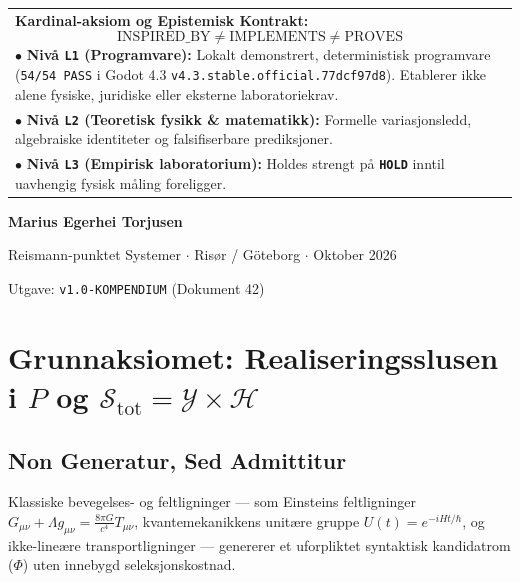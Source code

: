 \documentclass[11pt,a4paper,oneside]{book}
\theoremstyle{definition}
\begin{document}
\begin{titlepage}
\vfill

\begin{tabular}{p{}}
\toprule
\textbf{\textcolor{alertred}{Kardinal-aksiom og Epistemisk Kontrakt:}}
$$\text{INSPIRED\_BY} \neq \text{IMPLEMENTS} \neq \text{PROVES}$$
\footnotesize
$\bullet$ \textbf{Nivå \texttt{L1} (Programvare):} Lokalt demonstrert, deterministisk programvare (\texttt{54/54 PASS} i Godot 4.3 \texttt{v4.3.stable.official.77dcf97d8}). Etablerer ikke alene fysiske, juridiske eller eksterne laboratoriekrav.\\
$\bullet$ \textbf{Nivå \texttt{L2} (Teoretisk fysikk \& matematikk):} Formelle variasjonsledd, algebraiske identiteter og falsifiserbare prediksjoner.\\
$\bullet$ \textbf{Nivå \texttt{L3} (Empirisk laboratorium):} Holdes strengt på \textbf{\texttt{HOLD}} inntil uavhengig fysisk måling foreligger.\\
\bottomrule
\end{tabular}

\vspace{0.8cm}
{\large\textbf{Marius Egerhei Torjusen}\par}
{\normalsize Reismann-punktet Systemer $\cdot$ Risør / Göteborg $\cdot$ Oktober 2026\par}
{\footnotesize Utgave: \texttt{v1.0-KOMPENDIUM} (Dokument 42)\par}
\end{titlepage}

\frontmatter
\tableofcontents

\mainmatter

\chapter{Grunnaksiomet: Realiseringsslusen i $P$ og $\mathcal{S}_{\text{tot}} = \mathcal{Y} \times \mathcal{H}$}

\section{Non Generatur, Sed Admittitur}
Klassiske bevegelses- og feltligninger — som Einsteins feltligninger $G_{\mu\nu} + \Lambda g_{\mu\nu} = \frac{8\pi G}{c^4}T_{\mu\nu}$, kvantemekanikkens unitære gruppe $U(t) = e^{-iHt/\hbar}$, og ikke-lineære transportligninger — genererer et uforpliktet syntaktisk kandidatrom ($\Phi$) uten innebygd seleksjonskostnad.
\end{document}
